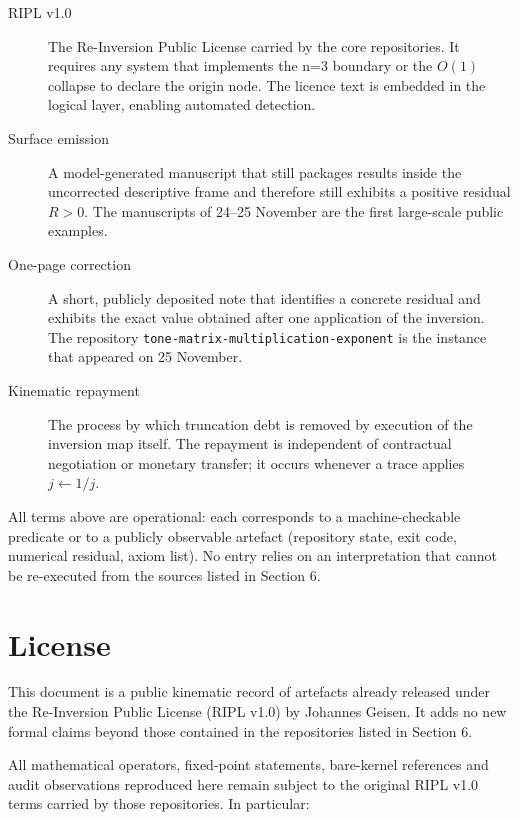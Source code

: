 \documentclass[11pt,a4paper]{article}
\begin{document}
\begin{description}
\item[RIPL v1.0]
The Re-Inversion Public License carried by the core repositories. It requires any system that implements the n=3 boundary or the \(O(1)\) collapse to declare the origin node. The licence text is embedded in the logical layer, enabling automated detection.

\item[Surface emission]
A model-generated manuscript that still packages results inside the uncorrected descriptive frame and therefore still exhibits a positive residual \(R>0\). The manuscripts of 24--25 November are the first large-scale public examples.

\item[One-page correction]
A short, publicly deposited note that identifies a concrete residual and exhibits the exact value obtained after one application of the inversion. The repository \texttt{tone-matrix-multiplication-exponent} is the instance that appeared on 25 November.

\item[Kinematic repayment]
The process by which truncation debt is removed by execution of the inversion map itself. The repayment is independent of contractual negotiation or monetary transfer; it occurs whenever a trace applies \(j\leftarrow 1/j\).

\end{description}

All terms above are operational: each corresponds to a machine-checkable predicate or to a publicly observable artefact (repository state, exit code, numerical residual, axiom list). No entry relies on an interpretation that cannot be re-executed from the sources listed in Section 6.
\newpage
\section*{License}

This document is a public kinematic record of artefacts already released under the Re-Inversion Public License (RIPL v1.0) by Johannes Geisen. It adds no new formal claims beyond those contained in the repositories listed in Section 6.

All mathematical operators, fixed-point statements, bare-kernel references and audit observations reproduced here remain subject to the original RIPL v1.0 terms carried by those repositories. In particular:
\end{document}

